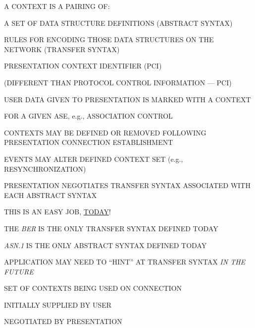 \begin{bwslide}

\begin{nrtc}
\item	A CONTEXT IS A PAIRING OF:
	\begin{nrtc}
	\item	A SET OF DATA STRUCTURE DEFINITIONS (ABSTRACT SYNTAX)
	\item	RULES FOR ENCODING THOSE DATA STRUCTURES ON THE NETWORK 
		(TRANSFER SYNTAX)
	\end{nrtc}
\item	PRESENTATION CONTEXT IDENTIFIER (PCI)
	\begin{nrtc}
	\item	{\small (DIFFERENT THAN PROTOCOL CONTROL INFORMATION --- PCI)}
	\end{nrtc}
\item	USER DATA GIVEN TO PRESENTATION IS MARKED WITH A CONTEXT
	\begin{nrtc}
	\item	FOR A GIVEN ASE, e.g., ASSOCIATION CONTROL
	\end{nrtc}
\item	CONTEXTS MAY BE DEFINED OR REMOVED FOLLOWING PRESENTATION CONNECTION
	ESTABLISHMENT
\item	EVENTS MAY ALTER DEFINED CONTEXT SET (e.g., RESYNCHRONIZATION)
\end{nrtc}
\end{bwslide}


\begin{bwslide}

\begin{nrtc}
\item	PRESENTATION NEGOTIATES TRANSFER SYNTAX ASSOCIATED WITH EACH
	ABSTRACT SYNTAX
	\begin{nrtc}
	\item	THIS IS AN EASY JOB, \underline{TODAY}!
	\end{nrtc}
\item	THE {\em BER} IS THE ONLY TRANSFER SYNTAX DEFINED TODAY
\item	{\em ASN.1} IS THE ONLY ABSTRACT SYNTAX DEFINED TODAY
\item	APPLICATION MAY NEED TO ``HINT'' AT TRANSFER SYNTAX {\em IN THE FUTURE}
\end{nrtc}
\end{bwslide}


\begin{bwslide}

\begin{nrtc}
\item	SET OF CONTEXTS BEING USED ON CONNECTION
\item	INITIALLY SUPPLIED BY USER
\item	NEGOTIATED BY PRESENTATION
\end{nrtc}
\end{bwslide}


